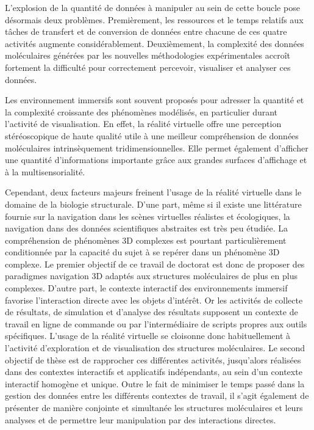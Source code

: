 L'explosion de la quantité de données à manipuler au sein de cette boucle pose désormais deux problèmes. Premièrement, les ressources et le temps relatifs aux tâches de transfert et de conversion de données entre chacune de ces quatre activités augmente considérablement. Deuxièmement, la complexité des données moléculaires générées par les nouvelles méthodologies expérimentales accroît fortement la difficulté pour correctement percevoir, visualiser et analyser ces données.

Les environnement immersifs sont souvent proposés pour adresser la quantité et la complexité croissante des phénomènes modélisés, en particulier durant l'activité de visualisation. En effet, la réalité virtuelle offre une perception stéréoscopique de haute qualité utile à une meilleur compréhension de données moléculaires intrinsèquement tridimensionnelles. Elle permet également d'afficher une quantité d'informations importante grâce aux grandes surfaces d'affichage et à la multisensorialité. 

Cependant, deux facteurs majeurs freinent l'usage de la réalité virtuelle dans le domaine de la biologie structurale. D'une part, même si il existe une littérature fournie sur la navigation dans les scènes virtuelles réalistes et écologiques, la navigation dans des données scientifiques abstraites est très peu étudiée. La compréhension de phénomènes 3D complexes est pourtant particulièrement conditionnée par la capacité du sujet à se repérer dans un phénomène 3D complexe. Le premier objectif de ce travail de doctorat est donc de proposer des paradigmes navigation 3D adaptés aux structures moléculaires de plus en plus complexes. D'autre part, le contexte interactif des environnements immersif favorise l'interaction directe avec les objets d'intérêt. Or les activités de collecte de résultats, de simulation et d'analyse des résultats supposent un contexte de travail en ligne de commande ou par l'intermédiaire de scripts propres aux outils spécifiques. L'usage de la réalité virtuelle se cloisonne donc habituellement à l'activité d'exploration et de visualisation des structures moléculaires. Le second objectif de thèse est de rapprocher ces différentes activités, jusqu'alors réalisées dans des contextes interactifs et applicatifs indépendants, au sein d'un contexte interactif homogène et unique. Outre le fait de minimiser le temps passé dans la gestion des données entre les différents contextes de travail, il s'agit également de présenter de manière conjointe et simultanée les structures moléculaires et leurs analyses et de permettre leur manipulation par des interactions directes.

